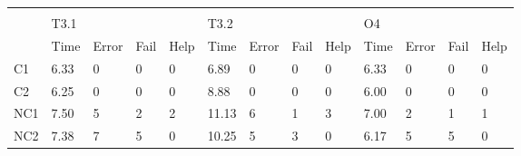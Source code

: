 \begin{table}[ht]
\begin{tabular}{lllllllllllll}
                              &                            &                            &                           &                           &                            &                            &                           &                           &                           &                            &                           &                           \\ \cline{2-13} 
    \multicolumn{1}{l|}{}     & \multicolumn{4}{l|}{T3.1}                                                                                       & \multicolumn{4}{l|}{T3.2}                                                                                       & \multicolumn{4}{l|}{O4}                                                                                        \\ \cline{2-13} 
    \multicolumn{1}{l|}{}     & \multicolumn{1}{l|}{Time}  & \multicolumn{1}{l|}{Error} & \multicolumn{1}{l|}{Fail} & \multicolumn{1}{l|}{Help} & \multicolumn{1}{l|}{Time}  & \multicolumn{1}{l|}{Error} & \multicolumn{1}{l|}{Fail} & \multicolumn{1}{l|}{Help} & \multicolumn{1}{l|}{Time} & \multicolumn{1}{l|}{Error} & \multicolumn{1}{l|}{Fail} & \multicolumn{1}{l|}{Help} \\ \hline
    \multicolumn{1}{|l|}{C1}  & \multicolumn{1}{l|}{6.33}  & \multicolumn{1}{l|}{0}     & \multicolumn{1}{l|}{0}    & \multicolumn{1}{l|}{0}    & \multicolumn{1}{l|}{6.89}  & \multicolumn{1}{l|}{0}     & \multicolumn{1}{l|}{0}    & \multicolumn{1}{l|}{0}    & \multicolumn{1}{l|}{6.33} & \multicolumn{1}{l|}{0}     & \multicolumn{1}{l|}{0}    & \multicolumn{1}{l|}{0}    \\ \hline
    \multicolumn{1}{|l|}{C2}  & \multicolumn{1}{l|}{6.25}  & \multicolumn{1}{l|}{0}     & \multicolumn{1}{l|}{0}    & \multicolumn{1}{l|}{0}    & \multicolumn{1}{l|}{8.88}  & \multicolumn{1}{l|}{0}     & \multicolumn{1}{l|}{0}    & \multicolumn{1}{l|}{0}    & \multicolumn{1}{l|}{6.00} & \multicolumn{1}{l|}{0}     & \multicolumn{1}{l|}{0}    & \multicolumn{1}{l|}{0}    \\ \hline
    \multicolumn{1}{|l|}{NC1} & \multicolumn{1}{l|}{7.50}  & \multicolumn{1}{l|}{5}     & \multicolumn{1}{l|}{2}    & \multicolumn{1}{l|}{2}    & \multicolumn{1}{l|}{11.13} & \multicolumn{1}{l|}{6}     & \multicolumn{1}{l|}{1}    & \multicolumn{1}{l|}{3}    & \multicolumn{1}{l|}{7.00} & \multicolumn{1}{l|}{2}     & \multicolumn{1}{l|}{1}    & \multicolumn{1}{l|}{1}    \\ \hline
    \multicolumn{1}{|l|}{NC2} & \multicolumn{1}{l|}{7.38}  & \multicolumn{1}{l|}{7}     & \multicolumn{1}{l|}{5}    & \multicolumn{1}{l|}{0}    & \multicolumn{1}{l|}{10.25} & \multicolumn{1}{l|}{5}     & \multicolumn{1}{l|}{3}    & \multicolumn{1}{l|}{0}    & \multicolumn{1}{l|}{6.17} & \multicolumn{1}{l|}{5}     & \multicolumn{1}{l|}{5}    & \multicolumn{1}{l|}{0}    \\ \hline

\end{tabular}
\end{table}
